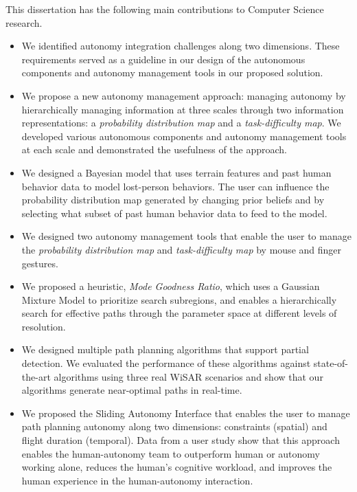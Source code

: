 This dissertation has the following main contributions to Computer Science research.

\begin{itemize}
\item We identified autonomy integration challenges along two dimensions. These requirements served as a guideline in our design of the autonomous components and autonomy management tools in our proposed solution.
\item We propose a new autonomy management approach: managing autonomy by hierarchically managing information at three scales through two information representations: a \textit{probability distribution map} and a \textit{task-difficulty map}. We developed various autonomous components and autonomy management tools at each scale and demonstrated the usefulness of the approach.
\item We designed a Bayesian model that uses terrain features and past human behavior data to model lost-person behaviors. The user can influence the probability distribution map generated by changing prior beliefs and by selecting what subset of past human behavior data to feed to the model.
\item We designed two autonomy management tools that enable the user to manage the \textit{probability distribution map} and \textit{task-difficulty map} by mouse and finger gestures.
\item We proposed a heuristic, \textit{Mode Goodness Ratio}, which uses a Gaussian Mixture Model to prioritize search subregions, and enables a hierarchically search for effective paths through the parameter space at different levels of resolution.
\item We designed multiple path planning algorithms that support partial detection. We evaluated the performance of these algorithms against state-of-the-art algorithms using three real WiSAR scenarios and show that our algorithms generate near-optimal paths in real-time.
\item We proposed the Sliding Autonomy Interface that enables the user to manage path planning autonomy along two dimensions: constraints (spatial) and flight duration (temporal). Data from a user study show that this approach enables the human-autonomy team to outperform human or autonomy working alone, reduces the human's cognitive workload, and improves the human experience in the human-autonomy interaction.
\end{itemize}


